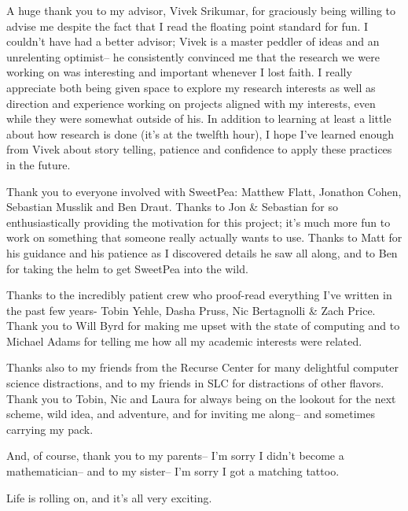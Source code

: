 
A huge thank you to my advisor, Vivek Srikumar, for graciously being willing to advise me despite the fact that I read the floating point standard for fun. I couldn't have had a better advisor; Vivek is a master peddler of ideas and an unrelenting optimist-- he consistently convinced me that the research we were working on was interesting and important whenever I lost faith. I really appreciate both being given space to explore my research interests as well as direction and experience working on projects aligned with my interests, even while they were somewhat outside of his. In addition to learning at least a little about how research is done (it's at the twelfth hour), I hope I've learned enough from Vivek about story telling, patience and confidence to apply these practices in the future.

Thank you to everyone involved with SweetPea: Matthew Flatt, Jonathon Cohen, Sebastian Musslik and Ben Draut. Thanks to Jon \& Sebastian for so enthusiastically providing the motivation for this project; it's much more fun to work on something that someone really actually wants to use. Thanks to Matt for his guidance and his patience as I discovered details he saw all along, and to Ben for taking the helm to get SweetPea into the wild.

Thanks to the incredibly patient crew who proof-read everything I've written in the past few years- Tobin Yehle, Dasha Pruss, Nic Bertagnolli \& Zach Price. Thank you to Will Byrd for making me upset with the state of computing and to Michael Adams for telling me how all my academic interests were related.

Thanks also to my friends from the Recurse Center for many delightful computer science distractions, and to my friends in SLC for distractions of other flavors. Thank you to Tobin, Nic and Laura for always being on the lookout for the next scheme, wild idea, and adventure, and for inviting me along-- and sometimes carrying my pack.

And, of course, thank you to my parents-- I'm sorry I didn't become a mathematician-- and to my sister-- I'm sorry I got a matching tattoo.

Life is rolling on, and it's all very exciting.

